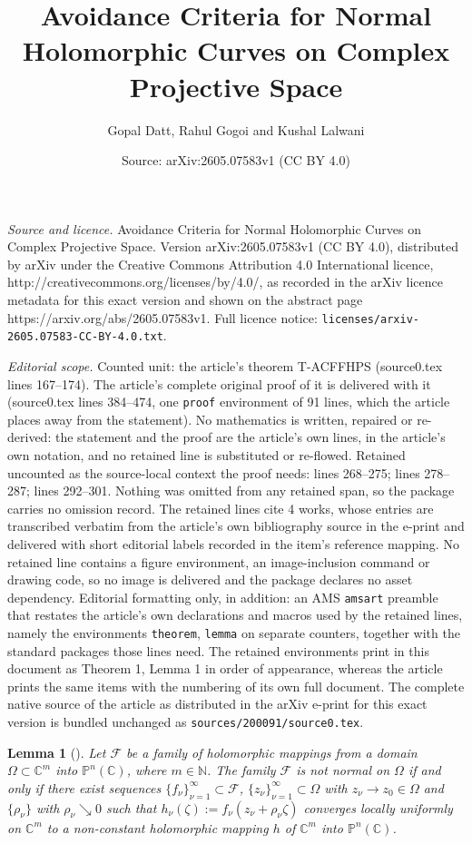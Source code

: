 \documentclass[10pt,a4paper]{amsart}
\title{Avoidance Criteria for Normal Holomorphic Curves on Complex Projective Space}
\author{Gopal Datt, Rahul Gogoi \MakeLowercase {and} Kushal Lalwani}
\date{Source: arXiv:2605.07583v1 (CC BY 4.0)}
\newtheorem{lemma}{Lemma}
\begin{document}
\maketitle

\noindent\emph{Source and licence.} Avoidance Criteria for Normal Holomorphic Curves on Complex Projective Space. Version arXiv:2605.07583v1 (CC BY 4.0), distributed by arXiv under the Creative Commons Attribution 4.0 International licence, http://creativecommons.org/licenses/by/4.0/, as recorded in the arXiv licence metadata for this exact version and shown on the abstract page https://arxiv.org/abs/2605.07583v1. Full licence notice: \texttt{licenses/arxiv-2605.07583-CC-BY-4.0.txt}.\par\smallskip

\noindent\textit{Editorial scope.} Counted unit: the article's theorem T-ACFFHPS (source0.tex lines 167--174). The article's complete original proof of it is delivered with it (source0.tex lines 384--474, one \texttt{proof} environment of 91 lines, which the article places away from the statement). No mathematics is written, repaired or re-derived: the statement and the proof are the article's own lines, in the article's own notation, and no retained line is substituted or re-flowed.  Retained uncounted as the source-local context the proof needs: lines 268--275; lines 278--287; lines 292--301.  Nothing was omitted from any retained span, so the package carries no omission record.  The retained lines cite 4 works, whose entries are transcribed verbatim from the article's own bibliography source in the e-print and delivered with short editorial labels recorded in the item's reference mapping.  No retained line contains a figure environment, an image-inclusion command or drawing code, so no image is delivered and the package declares no asset dependency.  Editorial formatting only, in addition: an AMS \texttt{amsart} preamble that restates the article's own declarations and macros used by the retained lines, namely the environments \texttt{theorem}, \texttt{lemma} on separate counters, together with the standard packages those lines need.  The retained environments print in this document as Theorem 1, Lemma 1 in order of appearance, whereas the article prints the same items with the numbering of its own full document.  The complete native source of the article as distributed in the arXiv e-print for this exact version is bundled unchanged as \texttt{sources/200091/source0.tex}.
\begin{lemma}[{\cite[Theorem 2.5]{thai-fonmiscvahocs-2003}}] \label{L-Thai_Zalcman_Projective} 
Let $\mathcal{F}$ be a family of holomorphic mappings from a domain $\Omega\subset \mathbb{C}^m$ into $\mathbb{P}^n(\mathbb{C})$, where $m\in\mathbb N$. The family 
$\mathcal{F}$ is not normal on $\Omega$ if and only if there exist sequences $\{f_{\nu}\}_{\nu=1}^\infty \subset \mathcal{F}$, $\{z_{\nu}\}_{\nu=1}^\infty \subset \Omega$ with 
$z_{\nu} \to z_0 \in \Omega$ and $\{\rho_{\nu}\}$ with $\rho_{\nu}\searrow 0$ such that
$h_{\nu}(\zeta) := f_{\nu}(z_{\nu} + \rho_{\nu} \zeta)$
converges locally uniformly on $\mathbb{C}^m$ to a non-constant holomorphic mapping $h$ of $\mathbb{C}^m$ into 
$\mathbb{P}^n(\mathbb{C})$.
\end{lemma}
\end{document}
